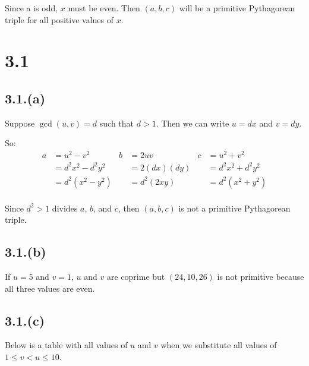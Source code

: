 \documentclass[letterpaper, 12pt, oneside]{memoir}
\theoremstyle{mystyle}
\begin{document}
Since a is odd, $x$ must be even. Then $(a,b,c)$ will be a primitive Pythagorean
triple for all positive values of $x$.

\section*{3.1}

\subsection*{3.1.(a)}
Suppose $\gcd(u,v) = d$ such that $d > 1$. Then we can write $u = dx$ and 
$v = dy$.

So:
\begin{align*}
    a &= u^2 - v^2          & b &= 2uv          & c &= u^2 + v^2\\
      &= d^2 x^2 - d^2 y^2  &   &= 2(dx)(dy)    &   &= d^2 x^2 + d^2 y^2\\
      &= d^2(x^2 - y^2)     &   &= d^2 (2xy)    &   &= d^2 (x^2 + y^2) \\
\end{align*}

Since $d^2 > 1$ divides $a$, $b$, and $c$, then $(a,b,c)$ is not a primitive
Pythagorean triple.

\subsection*{3.1.(b)}
If $u = 5$ and $v = 1$, $u$ and $v$ are coprime but $(24, 10, 26)$ is not 
primitive because all three values are even.

\subsection*{3.1.(c)}
Below is a table with all values of $u$ and $v$ when we substitute all values
of ${1 \leq v < u \leq 10}$.
\end{document}

